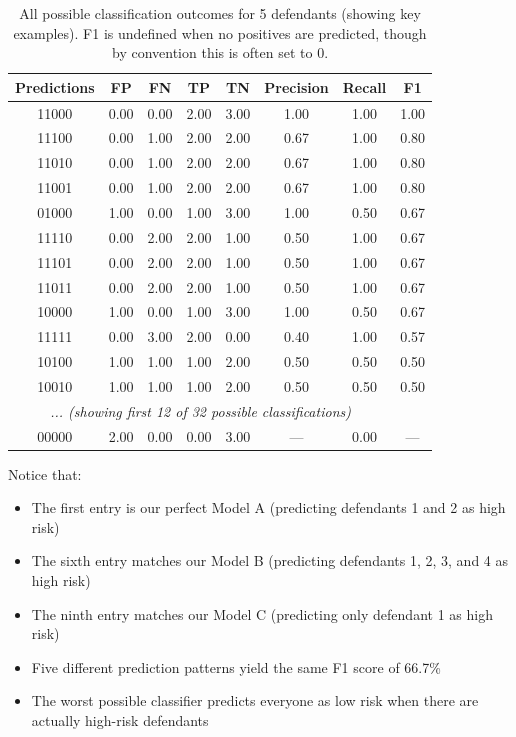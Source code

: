 \begin{table}[H]
\centering
\footnotesize
\begin{tabular}{cccccccc}
\toprule
\textbf{Predictions} & \textbf{FP} & \textbf{FN} & \textbf{TP} & \textbf{TN} & \textbf{Precision} & \textbf{Recall} & \textbf{F1} \\
\midrule
11000 & 0.00 & 0.00 & 2.00 & 3.00 & 1.00 & 1.00 & 1.00 \\
11100 & 0.00 & 1.00 & 2.00 & 2.00 & 0.67 & 1.00 & 0.80 \\
11010 & 0.00 & 1.00 & 2.00 & 2.00 & 0.67 & 1.00 & 0.80 \\
11001 & 0.00 & 1.00 & 2.00 & 2.00 & 0.67 & 1.00 & 0.80 \\
01000 & 1.00 & 0.00 & 1.00 & 3.00 & 1.00 & 0.50 & 0.67 \\
11110 & 0.00 & 2.00 & 2.00 & 1.00 & 0.50 & 1.00 & 0.67 \\
11101 & 0.00 & 2.00 & 2.00 & 1.00 & 0.50 & 1.00 & 0.67 \\
11011 & 0.00 & 2.00 & 2.00 & 1.00 & 0.50 & 1.00 & 0.67 \\
10000 & 1.00 & 0.00 & 1.00 & 3.00 & 1.00 & 0.50 & 0.67 \\
11111 & 0.00 & 3.00 & 2.00 & 0.00 & 0.40 & 1.00 & 0.57 \\
10100 & 1.00 & 1.00 & 1.00 & 2.00 & 0.50 & 0.50 & 0.50 \\
10010 & 1.00 & 1.00 & 1.00 & 2.00 & 0.50 & 0.50 & 0.50 \\
\midrule
\multicolumn{7}{c}{\textit{... (showing first 12 of 32 possible classifications)}} \\
\midrule
00000 & 2.00 & 0.00 & 0.00 & 3.00 & --- & 0.00 & --- \\
\bottomrule
\end{tabular}
\caption{All possible classification outcomes for 5 defendants (showing key examples). F1 is undefined when no positives are predicted, though by convention this is often set to 0.}
\label{tab:all-possible-classifications}
\end{table}


Notice that:
\begin{itemize}
\item The first entry is our perfect Model A (predicting defendants 1 and 2 as high risk)
\item The sixth entry matches our Model B (predicting defendants 1, 2, 3, and 4 as high risk)
\item The ninth entry matches our Model C (predicting only defendant 1 as high risk)
\item Five different prediction patterns yield the same F1 score of 66.7\%
\item The worst possible classifier predicts everyone as low risk when there are actually high-risk defendants
\end{itemize}

